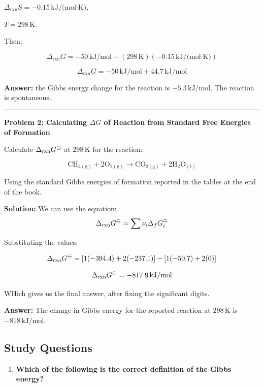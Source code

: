 \documentclass[
  9pt,
]{extbook}
\providecommand{\tightlist}{%
  \setlength{\itemsep}{0pt}\setlength{\parskip}{0pt}}
\theoremstyle{definition}
\theoremstyle{definition}
\theoremstyle{definition}
\theoremstyle{definition}
\theoremstyle{remark}
\begin{document}
\(\Delta_{\text{rxn}} S = -0.15\,\text{kJ/(mol·K)}\),

\(T=298\,\text{K}\).

Then:

\[\Delta_{\text{rxn}} G = -50\,\text{kJ/mol} - (298\,\text{K})(-0.15\,\text{kJ/(mol·K)})\]

\[\Delta_{\text{rxn}} G = -50\,\text{kJ/mol} + 44.7\,\text{kJ/mol}\]

\textbf{Answer:} the Gibbs energy change for the reaction is \(-5.3\,\text{kJ/mol}\). The reaction is spontaneous.

\begin{center}\rule{0.5\linewidth}{0.5pt}\end{center}

\textbf{Problem 2: Calculating \(\Delta G\) of Reaction from Standard Free Energies of Formation}

Calculate \(\Delta_{\text{rxn}}G^{{-\kern-6pt{\ominus}\kern-6pt-}}\) at \(298\,\text{K}\) for the reaction:

\[\text{CH}_{4(\text{g})} + 2\text{O}_{2(\text{g})} \rightarrow \text{CO}_{2(\text{g})} + 2\text{H}_{2}\text{O}_{(\text{l})}\]

Using the standard Gibbs energies of formation reported in the tables at the end of the book.

\textbf{Solution:} We can use the equation: \[\Delta_{\text{rxn}}G^{{-\kern-6pt{\ominus}\kern-6pt-}} = \sum \nu_i \Delta_f G^{{-\kern-6pt{\ominus}\kern-6pt-}}_i\]

Substituting the values:

\[\Delta_{\text{rxn}}G^{{-\kern-6pt{\ominus}\kern-6pt-}} = [1(-394.4) + 2(-237.1)] - [1(-50.7) + 2(0)]\]

\[\Delta_{\text{rxn}}G^{{-\kern-6pt{\ominus}\kern-6pt-}} = -817.9\,\text{kJ/mol}\]

WHich gives us the final answer, after fixing the significant digits.

\textbf{Answer:} The change in Gibbs energy for the reported reaction at \(298\,\text{K}\) is \(-818\,\text{kJ/mol}\).

\subsection{Study Questions}\label{quest9}

\begin{enumerate}
\def\labelenumi{\arabic{enumi}.}
\tightlist
\item
  \textbf{Which of the following is the correct definition of the Gibbs energy?}
\end{enumerate}
\end{document}
